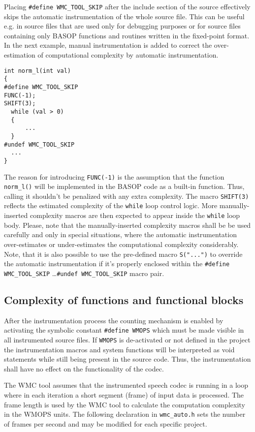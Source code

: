 Placing \verb|#define WMC_TOOL_SKIP| after the include section of the source effectively skips the automatic instrumentation of the whole source file. This can be useful e.g. in source files that are used only for debugging purposes or for source files containing only BASOP functions and routines written in the fixed-point format. In the next example, manual instrumentation is added to correct the over-estimation of computational complexity by automatic instrumentation.

\begin{Verbatim}[fontsize=\small]
int norm_l(int val)	
{
#define WMC_TOOL_SKIP	
FUNC(-1); 
SHIFT(3); 
  while (val > 0)	
  {	
      ...
  }
#undef WMC_TOOL_SKIP
  ...
}
\end{Verbatim}

The reason for introducing \verb|FUNC(-1)| is the assumption that the function \verb|norm_l()| will be implemented in the BASOP code as a built-in function. Thus, calling it shouldn't be penalized with any extra complexity. The macro \verb|SHIFT(3)| reflects the estimated complexity of the \verb|while| loop control logic. More manually-inserted complexity macros are then expected to appear inside the \verb|while| loop body. Please, note that the manually-inserted complexity macros shall be be used carefully and only in special situations, where the automatic instrumentation over-estimates or under-estimates the computational complexity considerably. Note, that it is also possible to use the pre-defined macro \verb|S("...")| to override the automatic instrumentation if it's properly enclosed within the \verb|#define WMC_TOOL_SKIP| \ldots \verb|#undef WMC_TOOL_SKIP| macro pair.

\subsection{Complexity of functions and functional blocks}

After the instrumentation process the counting mechanism is enabled by activating the symbolic constant \verb|#define WMOPS| which must be made visible in all instrumented source files. If \verb|WMOPS| is de-activated or not defined in the project the instrumentation macros and system functions will be interpreted as void statements while still being present in the source code. Thus, the instrumentation shall have no effect on the functionality of the codec.

The WMC tool assumes that the instrumented speech codec is running in a loop where in each iteration a short segment (frame) of input data is processed. The frame length is used by the WMC tool to calculate the computation complexity in the WMOPS units. The following declaration in \verb|wmc_auto.h| sets the number of frames per second and may be modified for each specific project.

